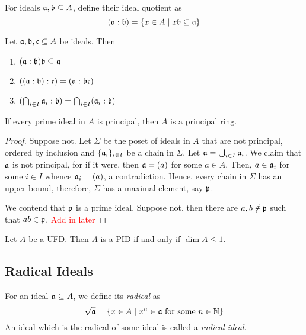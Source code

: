 For ideals $\mathfrak a,\mathfrak b\subseteq A$, define their ideal quotient as 
\begin{equation*}
    (\mathfrak a:\mathfrak b) = \{x\in A\mid x\mathfrak b\subseteq\mathfrak a\}
\end{equation*}

\begin{proposition}
    Let $\mathfrak a,\mathfrak b,\mathfrak c\subseteq A$ be ideals. Then 
    \begin{enumerate}
        \item $(\mathfrak a:\mathfrak b)\mathfrak b\subseteq\mathfrak a$
        \item $((\mathfrak a:\mathfrak b):\mathfrak c) = (\mathfrak a:\mathfrak b\mathfrak c)$
        \item $(\bigcap_{i\in I}\mathfrak a_i:\mathfrak b) = \bigcap_{i\in I}(\mathfrak a_i:\mathfrak b)$
    \end{enumerate}
\end{proposition}

\begin{proposition}
    If every prime ideal in $A$ is principal, then $A$ is a principal ring.
\end{proposition}
\begin{proof}
    Suppose not. Let $\Sigma$ be the poset of ideals in $A$ that are not principal, ordered by inclusion and $\{\mathfrak a_i\}_{i\in I}$ be a chain in $\Sigma$. Let $\mathfrak a = \bigcup_{i\in I}\mathfrak a_i$. We claim that $\mathfrak a$ is not principal, for if it were, then $\mathfrak a = (a)$ for some $a\in A$. Then, $a\in\mathfrak a_i$ for some $i\in I$ whence $\mathfrak a_i = (a)$, a contradiction. Hence, every chain in $\Sigma$ has an upper bound, therefore, $\Sigma$ has a maximal element, say $\mathfrak p$.

    We contend that $\mathfrak p$ is a prime ideal. Suppose not, then there are $a,b\notin\mathfrak p$ such that $ab\in\mathfrak p$. \textcolor{red}{Add in later}
\end{proof}

\begin{proposition}
    Let $A$ be a UFD. Then $A$ is a PID if and only if $\dim A\le 1$.
\end{proposition}

\subsection{Radical Ideals}

\begin{definition}
    For an ideal $\mathfrak a\subseteq A$, we define its \textit{radical} as 
    \begin{equation*}
        \sqrt{\mathfrak a} = \{x\in A\mid x^n\in\mathfrak a\text{ for some }n\in\mathbb{N}\}
    \end{equation*}
    An ideal which is the radical of some ideal is called a \textit{radical ideal}.
\end{definition}

